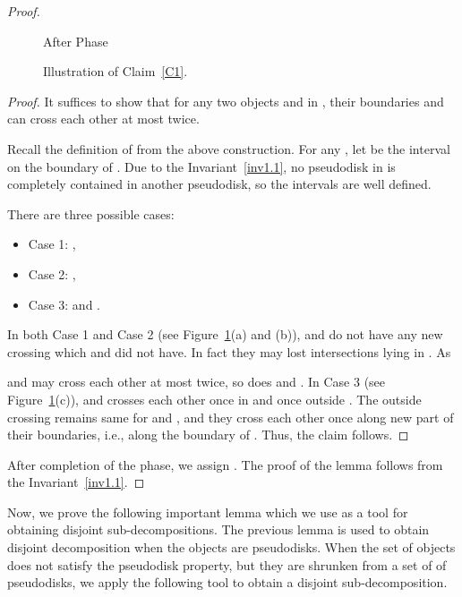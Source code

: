 \documentclass[a4paper,11pt]{article}
\begin{document}
\begin{proof}
\begin{figure}
\begin{minipage}{.4\linewidth}
    \caption*{After Phase }
  \end{minipage}
 \caption{Illustration of Claim~\ref{C1}.}
 \label{figDecompose}

\end{figure}

 \begin{proof}
It suffices to show that for any two objects  
 and  in , their boundaries  and   can cross each other at most twice. 
 
 Recall the definition of  from the above construction.
For any 
, let   be the interval  on 
the 
boundary of . Due to the Invariant~\ref{inv1.1},  no pseudodisk in  is completely 
contained in another pseudodisk, so the intervals are well defined.
 
 
 There are three possible cases: 

\begin{itemize}
 \item Case 1:  ,
\item Case 2:  ,
\item Case 3:   and 
.
\end{itemize}
In both Case 1 and Case 2 (see Figure~\ref{figDecompose}(a) and (b)),   and  
 do not have any new crossing which  
 and  
 did not have.
 In fact they may lost intersections lying in . As 
 
 and   may cross each other at most 
twice, so does  and  
.
In Case 3 (see Figure~\ref{figDecompose}(c)),    and  
 crosses each other once in  and once outside . The outside crossing remains same for  and  
, and they cross each other once along  new part of  their boundaries, i.e.,  along the boundary of . Thus, the claim follows.

\end{proof} 

 After completion 
of the  phase, we 
assign .
The proof of the lemma follows from the  Invariant~\ref{inv1.1}.
\end{proof}



Now, we prove the following important lemma which we use as a tool for obtaining disjoint sub-decompositions. The previous lemma is used to obtain disjoint decomposition when the objects are pseudodisks.  When the set of objects does not satisfy the pseudodisk property, but they are shrunken  from a set of of pseudodisks, we apply the following tool to obtain a disjoint sub-decomposition.
\end{document}
